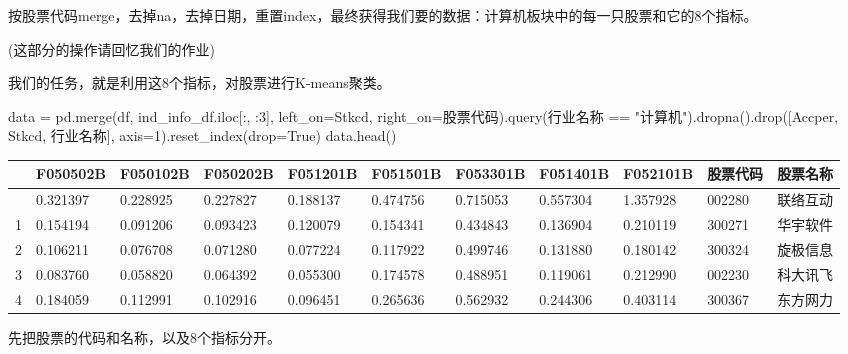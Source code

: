 \documentclass[
  letterpaper,
  DIV=11,
  numbers=noendperiod]{scrreprt}
\newenvironment{Shaded}{\begin{snugshade}}{\end{snugshade}}
\newcommand{\DecValTok}[1]{\textcolor[rgb]{0.68,0.00,0.00}{#1}}
\newcommand{\NormalTok}[1]{\textcolor[rgb]{0.00,0.23,0.31}{#1}}
\newcommand{\OperatorTok}[1]{\textcolor[rgb]{0.37,0.37,0.37}{#1}}
\newcommand{\StringTok}[1]{\textcolor[rgb]{0.13,0.47,0.30}{#1}}
\newcommand{\VariableTok}[1]{\textcolor[rgb]{0.07,0.07,0.07}{#1}}
\begin{document}
按股票代码merge，去掉na，去掉日期，重置index，最终获得我们要的数据：计算机板块中的每一只股票和它的8个指标。

(这部分的操作请回忆我们的作业)

我们的任务，就是利用这8个指标，对股票进行K-means聚类。

\begin{Shaded}
\begin{Highlighting}[]
\NormalTok{data }\OperatorTok{=}\NormalTok{ pd.merge(df, ind\_info\_df.iloc[:, :}\DecValTok{3}\NormalTok{], left\_on}\OperatorTok{=}\StringTok{\textquotesingle{}Stkcd\textquotesingle{}}\NormalTok{,}
\NormalTok{                right\_on}\OperatorTok{=}\StringTok{\textquotesingle{}股票代码\textquotesingle{}}\NormalTok{).query(}\StringTok{\textquotesingle{}行业名称 == "计算机"\textquotesingle{}}\NormalTok{).dropna().drop([}\StringTok{\textquotesingle{}Accper\textquotesingle{}}\NormalTok{, }\StringTok{\textquotesingle{}Stkcd\textquotesingle{}}\NormalTok{, }\StringTok{\textquotesingle{}行业名称\textquotesingle{}}\NormalTok{], axis}\OperatorTok{=}\DecValTok{1}\NormalTok{).reset\_index(drop}\OperatorTok{=}\VariableTok{True}\NormalTok{)}
\NormalTok{data.head()}
\end{Highlighting}
\end{Shaded}

\begin{longtable}[]{@{}lllllllllll@{}}
\toprule\noalign{}
& F050502B & F050102B & F050202B & F051201B & F051501B & F053301B &
F051401B & F052101B & 股票代码 & 股票名称 \\
\midrule\noalign{}
\endhead
\bottomrule\noalign{}
\endlastfoot
0 & 0.321397 & 0.228925 & 0.227827 & 0.188137 & 0.474756 & 0.715053 &
0.557304 & 1.357928 & 002280 & 联络互动 \\
1 & 0.154194 & 0.091206 & 0.093423 & 0.120079 & 0.154341 & 0.434843 &
0.136904 & 0.210119 & 300271 & 华宇软件 \\
2 & 0.106211 & 0.076708 & 0.071280 & 0.077224 & 0.117922 & 0.499746 &
0.131880 & 0.180142 & 300324 & 旋极信息 \\
3 & 0.083760 & 0.058820 & 0.064392 & 0.055300 & 0.174578 & 0.488951 &
0.119061 & 0.212990 & 002230 & 科大讯飞 \\
4 & 0.184059 & 0.112991 & 0.102916 & 0.096451 & 0.265636 & 0.562932 &
0.244306 & 0.403114 & 300367 & 东方网力 \\
\end{longtable}

先把股票的代码和名称，以及8个指标分开。
\end{document}
